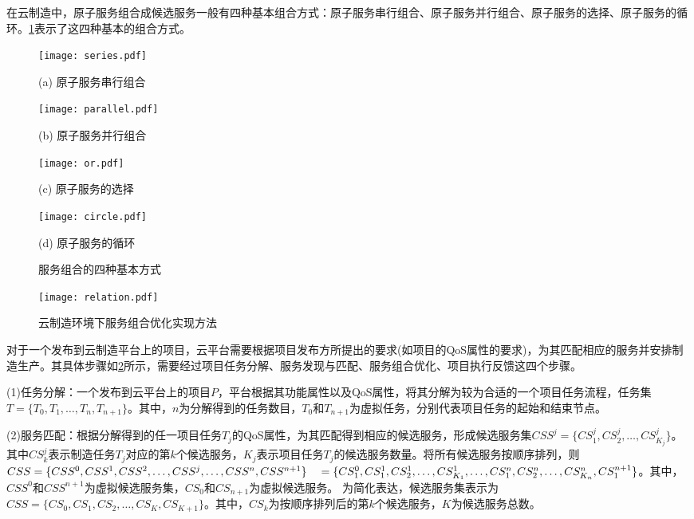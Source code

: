 \documentclass[UTF8]{ctexart}
\begin{document}
在云制造中，原子服务组合成候选服务一般有四种基本组合方式：原子服务串行组合、原子服务并行组合、原子服务的选择、原子服务的循环。\cref{fig:service_combine}表示了这四种基本的组合方式。

\begin{figure}[H]
\begin{minipage}{0.48\linewidth}
  \centerline{\texttt{[image: series.pdf]}}
  \centerline{(a) 原子服务串行组合}
\end{minipage}
\hfill
\begin{minipage}{.48\linewidth}
  \centerline{\texttt{[image: parallel.pdf]}}
  \centerline{(b) 原子服务并行组合}{}
\end{minipage}
\vfill
\begin{minipage}{0.48\linewidth}
  \centerline{\texttt{[image: or.pdf]}}
  \centerline{(c) 原子服务的选择}
\end{minipage}
\hfill
\begin{minipage}{0.48\linewidth}
  \centerline{\texttt{[image: circle.pdf]}}
  \centerline{(d) 原子服务的循环}
\end{minipage}
\scriptsize\caption{服务组合的四种基本方式}
\label{fig:service_combine}
\end{figure}


\begin{figure}
\centering
\texttt{[image: relation.pdf]}
\caption{云制造环境下服务组合优化实现方法}
\label{fig:relation}
\end{figure}

对于一个发布到云制造平台上的项目，云平台需要根据项目发布方所提出的要求(如项目的QoS属性的要求)，为其匹配相应的服务并安排制造生产。其具体步骤如\cref{fig:relation}所示，需要经过项目任务分解、服务发现与匹配、服务组合优化、项目执行反馈这四个步骤。

(1)任务分解：一个发布到云平台上的项目$P$，平台根据其功能属性以及QoS属性，将其分解为较为合适的一个项目任务流程，任务集$T = \{T_0, T_1, \dots, T_n, T_{n + 1}\}$。其中，$n$为分解得到的任务数目，$T_0$和$T_{n + 1}$为虚拟任务，分别代表项目任务的起始和结束节点。

(2)服务匹配：根据分解得到的任一项目任务$T_j$的QoS属性，为其匹配得到相应的候选服务，形成候选服务集$CSS^j = \{CS_1^j, CS_2^j, \dots, CS_{K_j}^j\}$。其中$CS_k^j$表示制造任务$T_j$对应的第$k$个候选服务，$K_j$表示项目任务$T_j$的候选服务数量。将所有候选服务按顺序排列，则\\$CSS = \{CSS^0, CSS^1, CSS^2, \dots, CSS^j, \dots, CSS^n, CSS^{n + 1} \} \\ \quad =   \{CS_1^0, CS_1^1, CS_2^1, \dots, CS_{K_1}^1, \dots, CS_1^n, CS_2^n, \dots, CS_{K_n}^n, CS_1^{n + 1}\}$。其中，$CSS^0$和$CSS^{n + 1}$为虚拟候选服务集，$CS_0$和$CS_{n + 1}$为虚拟候选服务。 为简化表达，候选服务集表示为$CSS = \{CS_0, CS_1, CS_2, \dots, CS_K, CS_{K + 1}\}$。其中，$CS_k$为按顺序排列后的第$k$个候选服务，$K$为候选服务总数。
\end{document}
